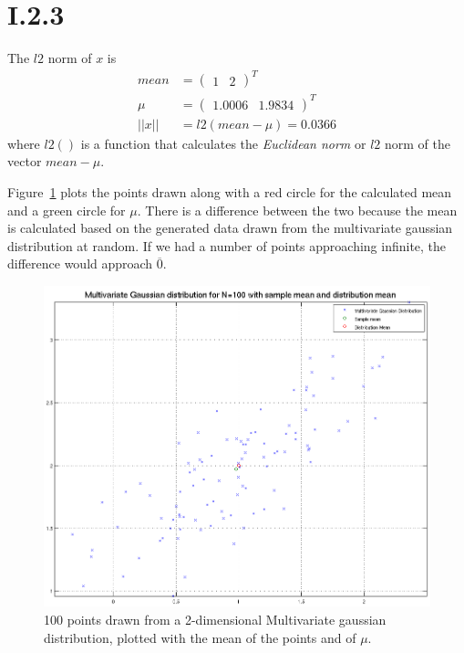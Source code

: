 \section*{I.2.3}
The $l2$ norm of $x$ is
\begin{align*}
	mean  &= \begin{pmatrix}1 & 2\end{pmatrix}^T \\
	\mu   &= \begin{pmatrix}1.0006 & 1.9834\end{pmatrix}^T \\
	||x|| &= l2(mean - \mu) = 0.0366
\end{align*}
where $l2()$ is a function that calculates the \textit{Euclidean norm} or $l2$
norm of the vector $mean - \mu$.

Figure~\ref{fig:I.2.3} plots the points drawn along with a red circle for the
calculated mean and a green circle for $\mu$. There is a difference between the
two because the mean is calculated based on the generated data drawn from the
multivariate gaussian distribution at random. If we had a number of points
approaching infinite, the difference would approach $\overline{0}$.

\begin{figure}[h!]
	\includegraphics[width=\textwidth]{img/multigaussmeanxy}
	\caption{100 points drawn from a 2-dimensional Multivariate gaussian
          distribution, plotted with the mean of the points and of $\mu$.
        \label{fig:I.2.3}}
\end{figure}


